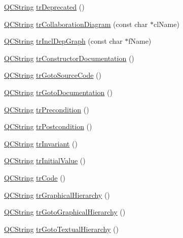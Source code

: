 \begin{DoxyCompactItemize}
\item 
\hyperlink{class_q_c_string}{Q\+C\+String} \hyperlink{class_translator_polish_ae3de06da645c6f37444d330b80445f90}{tr\+Deprecated} ()
\item 
\hyperlink{class_q_c_string}{Q\+C\+String} \hyperlink{class_translator_polish_a82e1c3150ac33284de27b9864f9810d1}{tr\+Collaboration\+Diagram} (const char $\ast$cl\+Name)
\item 
\hyperlink{class_q_c_string}{Q\+C\+String} \hyperlink{class_translator_polish_ace0ddab8c25f194d768e54e2753155a1}{tr\+Incl\+Dep\+Graph} (const char $\ast$f\+Name)
\item 
\hyperlink{class_q_c_string}{Q\+C\+String} \hyperlink{class_translator_polish_ab970f1b2df0e95738b3fcff513aa6d57}{tr\+Constructor\+Documentation} ()
\item 
\hyperlink{class_q_c_string}{Q\+C\+String} \hyperlink{class_translator_polish_a1959fa6fb4c06d512d00eb4bf956c27f}{tr\+Goto\+Source\+Code} ()
\item 
\hyperlink{class_q_c_string}{Q\+C\+String} \hyperlink{class_translator_polish_a92dc392aa7ba9219148d55e9ad1ca457}{tr\+Goto\+Documentation} ()
\item 
\hyperlink{class_q_c_string}{Q\+C\+String} \hyperlink{class_translator_polish_a8bae4d23fe88a88ecfa28b8ce6777e4a}{tr\+Precondition} ()
\item 
\hyperlink{class_q_c_string}{Q\+C\+String} \hyperlink{class_translator_polish_a928b04a80930cb2a4bf084fd4c45230a}{tr\+Postcondition} ()
\item 
\hyperlink{class_q_c_string}{Q\+C\+String} \hyperlink{class_translator_polish_a0f58719f4f4754556253f2be4048e146}{tr\+Invariant} ()
\item 
\hyperlink{class_q_c_string}{Q\+C\+String} \hyperlink{class_translator_polish_a675ae7842337be7efe61808e8a079ce8}{tr\+Initial\+Value} ()
\item 
\hyperlink{class_q_c_string}{Q\+C\+String} \hyperlink{class_translator_polish_ae72a70da9005a4d328c5e11a1c6f0057}{tr\+Code} ()
\item 
\hyperlink{class_q_c_string}{Q\+C\+String} \hyperlink{class_translator_polish_a9e2e9226516e9ee52948de783b75556a}{tr\+Graphical\+Hierarchy} ()
\item 
\hyperlink{class_q_c_string}{Q\+C\+String} \hyperlink{class_translator_polish_a0acf5f84b9ed46e55c59399a00760a96}{tr\+Goto\+Graphical\+Hierarchy} ()
\item 
\hyperlink{class_q_c_string}{Q\+C\+String} \hyperlink{class_translator_polish_a3313d008a09e8c77fc6cbb43e5d438d2}{tr\+Goto\+Textual\+Hierarchy} ()

\end{DoxyCompactItemize}
